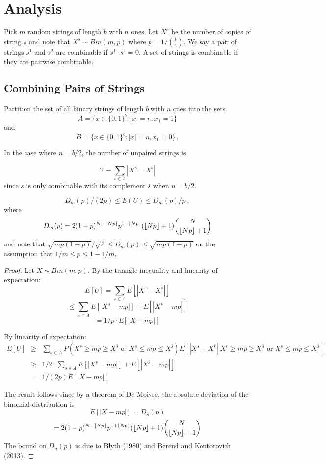 \section{Analysis}
\label{sec:analysis}

Pick $m$ random strings of length $b$ with $n$ ones.
Let $X^s$ be the number of copies of string $s$ and note that $X^s \sim Bin(m,p)$ where $p=1/{b \choose n}$. 
We say a pair of strings $s^1$ and $s^2$ are combinable if $s^1\cdot s^2=0$. A set of strings is combinable if they are pairwise combinable.

\subsection{Combining Pairs of Strings}

Partition the set of all binary strings of length $b$ with $n$ ones into the sets
\[A=\{x\in \{0,1\}^b: |x|=n, x_1=1\}\] and \[
B=\{x\in \{0,1\}^b: |x|=n, x_1=0\} \ .\]


In the case where $n=b/2$, the number of unpaired strings is 

\[U=\sum_{s\in A} |X^s-X^{\bar{s}}|\] 
since $s$ is only combinable with its complement $\bar{s}$ when $n=b/2$.

\begin{theorem}
\[D_m(p)/(2p) \leq E(U) \leq D_m(p)/p \ ,\]
where 
\[D_m(p)=2(1-p)^{N-\left \lfloor Np \right \rfloor}p^{1+\left \lfloor Np \right \rfloor}(\left \lfloor Np \right \rfloor+1){N\choose \left \lfloor Np \right \rfloor+1}\]
and note that $\sqrt{mp(1-p)}/\sqrt{2} \leq D_m(p)\leq \sqrt{mp(1-p)}$ on the assumption that $1/m\leq p\leq 1-1/m$.
\end{theorem}
\begin{proof}
Let $X\sim Bin(m,p)$.
By the triangle inequality and linearity of expectation:
\[E[U]=\sum_{s\in A} E[|X^s-X^{\bar{s}}|]\]
\[\leq \sum_{s\in A} E[|X^s-mp|] + E[|X^{\bar{s}}-mp|]\]
\[=1/p \cdot E[|X-mp|]\]

By linearity of expectation:
\begin{eqnarray*}
E[U]
& \geq & 
\sum_{s\in A} P(X^s\geq mp\geq X^{\bar{s}} \mbox{ or } X^s\leq mp\leq  X^{\bar{s}}) 
E[|X^s-X^{\bar{s}}| \big | X^s\geq mp\geq X^{\bar{s}} \mbox{ or } X^s\leq mp\leq  X^{\bar{s}}] \\
& \geq & 1/2 \cdot 
\sum_{s\in A} E[|X^s-mp|] + E[|X^{\bar{s}}-mp|]\\
& = & 1/(2p)  E[|X-mp|]
\end{eqnarray*}

The result follows since by a theorem of De Moivre, the absolute deviation of the binomial distribution is 
\[E[|X-mp|]=D_n(p)\]
\[=2(1-p)^{N-\left \lfloor Np \right \rfloor}p^{1+\left \lfloor Np \right \rfloor}(\left \lfloor Np \right \rfloor+1){N\choose \left \lfloor Np \right \rfloor+1}\] 
The bound on $D_n(p)$ is due to Blyth (1980) and  Berend and  Kontorovich (2013).
\end{proof}

